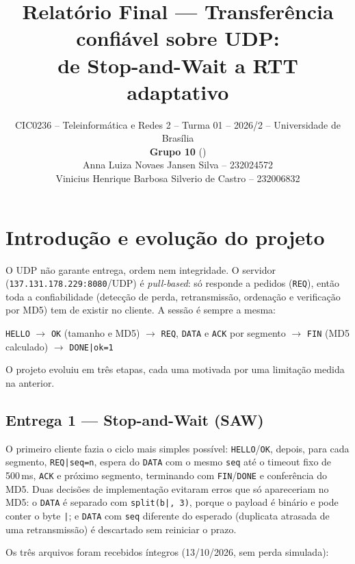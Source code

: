 \documentclass[11pt,a4paper]{article}
\title{\vspace{-1.2cm}Relatório Final --- Transferência confiável sobre UDP:\\
de Stop-and-Wait a RTT adaptativo}
\author{%
  CIC0236 -- Teleinformática e Redes 2 -- Turma 01 -- 2026/2 -- Universidade de Brasília\\[0.4em]
  \textbf{Grupo 10} (\cod{-{}-group grupo10})\\
  Anna Luiza Novaes Jansen Silva -- 232024572\\
  Vinicius Henrique Barbosa Silverio de Castro -- 232006832\\[0.4em]
}
\date{}
\newcommand{\cod}[1]{\textcolor{codverde}{\texttt{\small #1}}}
\begin{document}
\maketitle
\vspace{-0.5cm}

\section{Introdução e evolução do projeto}

O UDP não garante entrega, ordem nem integridade. O servidor (\cod{137.131.178.229:8080}/UDP) é
\emph{pull-based}: só responde a pedidos (\cod{REQ}), então toda a confiabilidade (detecção de perda,
retransmissão, ordenação e verificação por MD5) tem de existir no cliente. A sessão é sempre a mesma:
\begin{center}
\cod{HELLO} $\rightarrow$ \cod{OK} (tamanho e MD5) $\rightarrow$ \cod{REQ}, \cod{DATA} e \cod{ACK}
por segmento $\rightarrow$ \cod{FIN} (MD5 calculado) $\rightarrow$ \cod{DONE|ok=1}
\end{center}
O projeto evoluiu em três etapas, cada uma motivada por uma limitação medida na anterior.

\subsection{Entrega 1 --- Stop-and-Wait (SAW)}

O primeiro cliente fazia o ciclo mais simples possível: \cod{HELLO}/\cod{OK}, depois, para cada
segmento, \cod{REQ|seq=n}, espera do \cod{DATA} com o mesmo \cod{seq} até o timeout fixo de 500\,ms,
\cod{ACK} e próximo segmento, terminando com \cod{FIN}/\cod{DONE} e conferência do MD5. Duas decisões
de implementação evitaram erros que só apareceriam no MD5: o \cod{DATA} é separado com
\cod{split(b\textquotedbl|\textquotedbl, 3)}, porque o payload é binário e pode conter o byte \cod{|}; e \cod{DATA} com
\cod{seq} diferente do esperado (duplicata atrasada de uma retransmissão) é descartado sem reiniciar
o prazo.

Os três arquivos foram recebidos íntegros (13/10/2026, sem perda simulada):
\end{document}
